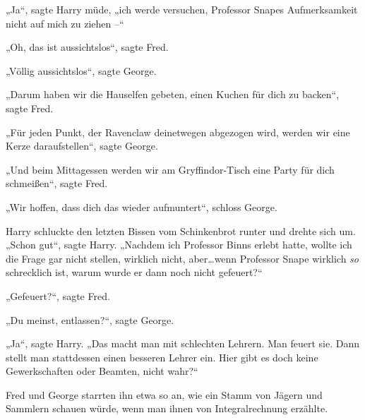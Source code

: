 „Ja“, sagte Harry müde, „ich werde versuchen, Professor Snapes Aufmerksamkeit nicht auf mich zu ziehen –“

„Oh, das ist aussichtslos“, sagte Fred.

„Völlig aussichtslos“, sagte George.

„Darum haben wir die Hauselfen gebeten, einen Kuchen für dich zu backen“, sagte Fred.

„Für jeden Punkt, der Ravenclaw deinetwegen abgezogen wird, werden wir eine Kerze daraufstellen“, sagte George.

„Und beim Mittagessen werden wir am Gryffindor-Tisch eine Party für dich schmeißen“, sagte Fred.

„Wir hoffen, dass dich das wieder aufmuntert“, schloss George.

Harry schluckte den letzten Bissen vom Schinkenbrot runter und drehte sich um. „Schon gut“, sagte Harry. „Nachdem ich Professor Binns erlebt hatte, wollte ich die Frage gar nicht stellen, wirklich nicht, aber…wenn Professor Snape wirklich \emph{so} schrecklich ist, warum wurde er dann noch nicht gefeuert?“

„Gefeuert?“, sagte Fred.

„Du meinst, entlassen?“, sagte George.

„Ja“, sagte Harry. „Das macht man mit schlechten Lehrern. Man feuert sie. Dann stellt man stattdessen einen besseren Lehrer ein. Hier gibt es doch keine Gewerkschaften oder Beamten, nicht wahr?“

Fred und George starrten ihn etwa so an, wie ein Stamm von Jägern und Sammlern schauen würde, wenn man ihnen von Integralrechnung erzählte.

